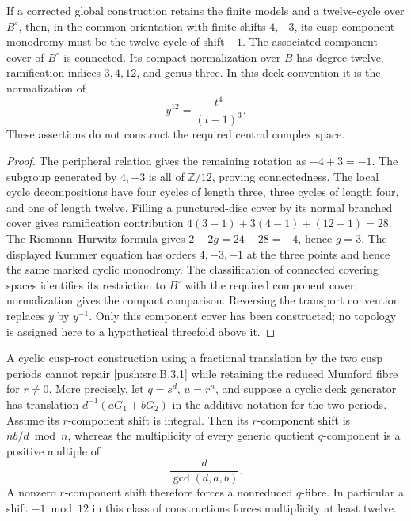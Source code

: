 \begin{proposition}\label{push:src:B.3.2}\label{push:B32}
If a corrected global construction retains the
finite models and a twelve-cycle over
$B^\circ$, then, in the common orientation
with finite shifts $4,-3$, its cusp
component monodromy must be the twelve-cycle
of shift $-1$. The associated component
cover of $B^\circ$ is connected. Its compact
normalization over $B$ has degree twelve,
ramification indices $3,4,12$, and genus
three. In this deck convention it is the
normalization of
\[
 y^{12}=\frac{t^4}{(t-1)^3}.
\]
These assertions do not construct
the required central complex space.
\end{proposition}

\begin{proof}
The peripheral relation gives the remaining
rotation as $-4+3=-1$. The subgroup generated
by $4,-3$ is all of $\mathbb Z/12$, proving
connectedness. The local cycle decompositions
have four cycles of length three, three
cycles of length four, and one of length
twelve. Filling a punctured-disc cover by
its normal branched cover gives ramification
contribution
$4(3-1)+3(4-1)+(12-1)=28$.
The Riemann--Hurwitz formula gives
$2-2g=24-28=-4$, hence $g=3$.
The displayed Kummer equation has orders
$4,-3,-1$ at the three points and hence
the same marked cyclic monodromy. The
classification of connected covering
spaces identifies its restriction to
$B^\circ$ with the required component
cover; normalization gives the compact
comparison. Reversing the transport
convention replaces $y$ by $y^{-1}$.
Only this component cover has been
constructed; no topology is assigned here
to a hypothetical threefold above it.
\end{proof}

\begin{proposition}\label{push:src:B.3.3}\label{push:B33}
A cyclic cusp-root construction using a
fractional translation by the two cusp
periods cannot repair \ref{push:src:B.3.1} while retaining
the reduced Mumford fibre for $r\ne0$.
More precisely, let $q=s^d$, $u=r^n$,
and suppose a cyclic deck generator has
translation $d^{-1}(aG_1+bG_2)$ in the
additive notation for the two periods.
Assume its $r$-component shift is integral.
Then its $r$-component shift is
$nb/d\bmod n$, whereas the multiplicity
of every generic quotient $q$-component
is a positive multiple of
\[
 \frac{d}{\gcd(d,a,b)}.
\]
A nonzero $r$-component shift therefore
forces a nonreduced $q$-fibre. In
particular a shift $-1\bmod12$ in this
class of constructions forces multiplicity
at least twelve.
\end{proposition}

